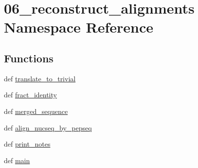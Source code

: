 \hypertarget{namespace06__reconstruct__alignments}{\section{06\-\_\-reconstruct\-\_\-alignments Namespace Reference}
\label{namespace06__reconstruct__alignments}
}
\subsection*{Functions}
\begin{DoxyCompactItemize}
\item 
def \hyperlink{namespace06__reconstruct__alignments_a06b5e809dbf00a2b306e134dc2d7aa8a}{translate\-\_\-to\-\_\-trivial}
\item 
def \hyperlink{namespace06__reconstruct__alignments_ab0c8f2f192c154ff5262067d16509312}{fract\-\_\-identity}
\item 
def \hyperlink{namespace06__reconstruct__alignments_a4353cf09066cac44249567007ac97363}{merged\-\_\-sequence}
\item 
def \hyperlink{namespace06__reconstruct__alignments_ac8f6c6cfa49162a99d41f892651b8104}{align\-\_\-nucseq\-\_\-by\-\_\-pepseq}
\item 
def \hyperlink{namespace06__reconstruct__alignments_aa1e7de847b48c4db41cfb1b20a080c29}{print\-\_\-notes}
\item 
def \hyperlink{namespace06__reconstruct__alignments_a275d31f1f804039829052ec7f21867c9}{main}
\end{DoxyCompactItemize}


